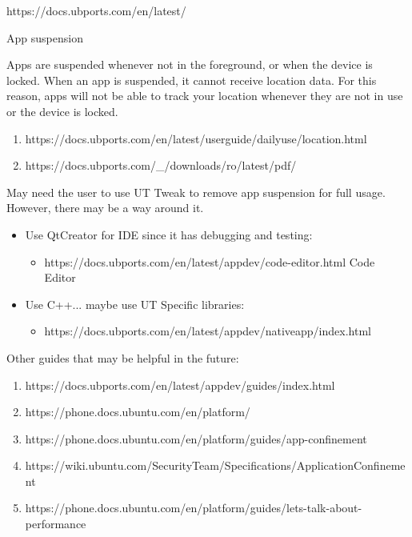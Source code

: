 
https://docs.ubports.com/en/latest/
\label{ch: considerations}





%



App suspension

Apps are suspended whenever not in the foreground, or when the device is locked. When an app is suspended, it cannot receive location data. For this reason, apps will not be able to track your location whenever they are not in use or the device is locked.

\begin{enumerate}
	\item https://docs.ubports.com/en/latest/userguide/dailyuse/location.html
	\item https://docs.ubports.com/\_/downloads/ro/latest/pdf/
\end{enumerate}

May need the user to use UT Tweak to remove app suspension for full usage.
However, there may be a way around it.

\vspace{10 pt}

\begin{itemize}
	\item Use QtCreator for IDE since it has debugging and testing:
	\begin{itemize}
		\item https://docs.ubports.com/en/latest/appdev/code-editor.html
	Code Editor
	\end{itemize}
\end{itemize}


\begin{itemize}
	\item Use C++... maybe use UT Specific libraries:
	\begin{itemize}
		\item https://docs.ubports.com/en/latest/appdev/nativeapp/index.html
	\end{itemize}
\end{itemize}





\vspace{10 pt}


Other guides that may be helpful in the future:
\begin{enumerate}
	\item https://docs.ubports.com/en/latest/appdev/guides/index.html
	\item https://phone.docs.ubuntu.com/en/platform/
	\item https://phone.docs.ubuntu.com/en/platform/guides/app-confinement
	\item https://wiki.ubuntu.com/SecurityTeam/Specifications/ApplicationConfinement
	\item https://phone.docs.ubuntu.com/en/platform/guides/lets-talk-about-performance
\end{enumerate}
